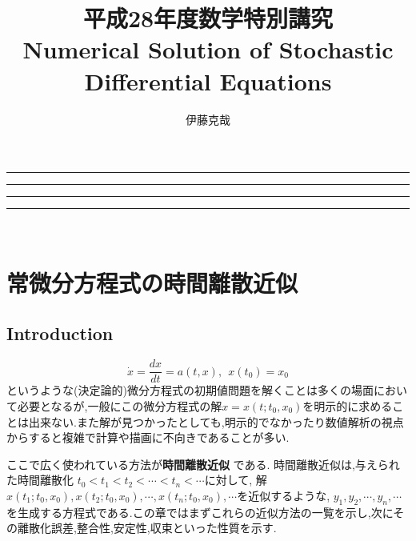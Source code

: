 \documentclass[a4paper]{jreport}
\title{平成28年度数学特別講究\\Numerical Solution of Stochastic Differential Equations}
\author{伊藤克哉}
\makeatletter
\numberwithin{equation}{section}
\def\eq{\begin{equation}}
\def\eqx{\end{equation}}
\renewcommand{\maketitle}{\begin{titlepage}%
    \let\footnotesize\small
    \let\footnoterule\relax
    \parindent \z@
    \reset@font
    \null
    \vskip 50\p@
    \begin{center}
      \hrule height 1pt
      \vskip 2pt 
      \hrule
      \vskip 3pt
      {\huge \bfseries \strut \@title \strut}\par
      \vskip 2pt
      \hrule
      \vskip 2pt
      \hrule height 1pt
    \end{center}
    \vskip 50\p@
    \begin{flushright}
      \Large \@author \par
    \end{flushright}
    \vfil
    \null
    \begin{flushright}
        {\small \@date}%
    \end{flushright}
  \end{titlepage}%
  \setcounter{footnote}{0}%
}
\makeatother
\begin{document}
\maketitle
\tableofcontents
\leavevmode \\
\chapter{常微分方程式の時間離散近似}
\section{Introduction}
\eq
\label{eq1}
\dot{x} = \frac{dx}{dt} = a(t,x), \  \  x(t_0) = x_0
\eqx
というような(決定論的)微分方程式の初期値問題を解くことは多くの場面において必要となるが,一般にこの微分方程式の解$x = x(t;t_0,x_0)$を明示的に求めることは出来ない.また解が見つかったとしても,明示的でなかったり数値解析の視点からすると複雑で計算や描画に不向きであることが多い.\par
ここで広く使われている方法が{\bf 時間離散近似} である.
時間離散近似は,与えられた時間離散化 $ t_0 < t_1 < t_2 < \cdots < t_n < \cdots $に対して,
解$x(t_1;t_0,x_0),x(t_2;t_0,x_0),\cdots,x(t_n;t_0,x_0),\cdots$を近似するような,
$y_1,y_2,\cdots,y_n,\cdots$を生成する方程式である.この章ではまずこれらの近似方法の一覧を示し,次にその離散化誤差,整合性,安定性,収束といった性質を示す.
\end{document}
